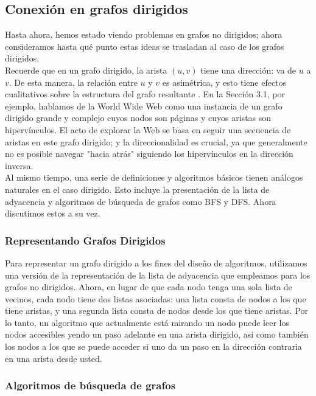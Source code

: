 \documentclass[a4paper, 12pt]{book}
\theoremstyle{dotless}
\begin{document}
\subsection{Conexión en grafos dirigidos}

Hasta ahora, hemos estado viendo problemas en grafos no dirigidos; ahora consideramos hasta qué punto estas ideas se trasladan al caso de los grafos dirigidos.\\

Recuerde que en un grafo dirigido, la arista $(u, v)$ tiene una dirección: va de $u$ a $v$. De esta manera, la relación entre $u$ y $v$ es asimétrica, y esto tiene efectos cualitativos sobre la estructura del grafo resultante . En la Sección 3.1, por ejemplo, hablamos de la World Wide Web como una instancia de un grafo dirigido grande y complejo cuyos nodos son páginas y cuyos aristas son hipervínculos. El acto de explorar la Web se basa en seguir una secuencia de aristas en este grafo dirigido; y la direccionalidad es crucial, ya que generalmente no es posible navegar "hacia atrás" siguiendo los hipervínculos en la dirección inversa.\\

Al mismo tiempo, una serie de definiciones y algoritmos básicos tienen análogos naturales en el caso dirigido. Esto incluye la presentación de la lista de adyacencia y algoritmos de búsqueda de grafos como BFS y DFS. Ahora discutimos estos a su vez.\\

\subsubsection*{Representando Grafos Dirigidos}

Para representar un grafo dirigido a los fines del diseño de algoritmos, utilizamos una versión de la representación de la lista de adyacencia que empleamos para los grafos no dirigidos. Ahora, en lugar de que cada nodo tenga una sola lista de vecinos, cada nodo tiene dos listas asociadas: una lista consta de nodos a los que tiene aristas, y una segunda lista consta de nodos desde los que tiene aristas. Por lo tanto, un algoritmo que actualmente está mirando un nodo puede leer los nodos accesibles yendo un paso adelante en una arista dirigido, así como también los nodos a los que se puede acceder si uno da un paso en la dirección contraria en una arista desde usted.\\

\subsubsection*{Algoritmos de búsqueda de grafos}
\end{document}
